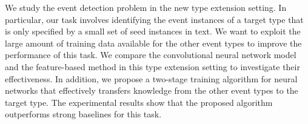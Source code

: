 We study the event detection problem in the new type extension setting. In particular, our task involves identifying the event instances of a target type that is only specified by a small set of seed instances in text. We want to exploit the large amount of training data available for the other event types to improve the performance of this task. We compare the convolutional neural network model and the feature-based method in this type extension setting to investigate their effectiveness. In addition, we propose a two-stage training algorithm for neural networks that effectively transfers knowledge from the other event types to the target type. The experimental results show that the proposed algorithm outperforms strong baselines for this task.

